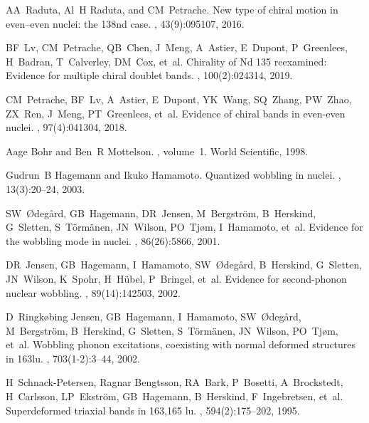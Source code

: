 \documentclass[11pt]{article}
\begin{document}
\begin{thebibliography}{99}
AA~Raduta, Al~H Raduta, and CM~Petrache.
\newblock New type of chiral motion in even--even nuclei: the 138nd case.
, 43(9):095107, 2016.

BF~Lv, CM~Petrache, QB~Chen, J~Meng, A~Astier, E~Dupont, P~Greenlees, H~Badran,
  T~Calverley, DM~Cox, et~al.
\newblock Chirality of Nd 135 reexamined: Evidence for multiple chiral doublet
  bands.
, 100(2):024314, 2019.

CM~Petrache, BF~Lv, A~Astier, E~Dupont, YK~Wang, SQ~Zhang, PW~Zhao, ZX~Ren,
  J~Meng, PT~Greenlees, et~al.
\newblock Evidence of chiral bands in even-even nuclei.
, 97(4):041304, 2018.

Aage Bohr and Ben~R Mottelson.
, volume~1.
\newblock World Scientific, 1998.

Gudrun~B Hagemann and Ikuko Hamamoto.
\newblock Quantized wobbling in nuclei.
, 13(3):20--24, 2003.

SW~{\O}deg{\aa}rd, GB~Hagemann, DR~Jensen, M~Bergstr{\"o}m, B~Herskind,
  G~Sletten, S~T{\"o}rm{\"a}nen, JN~Wilson, PO~Tj{\o}m, I~Hamamoto, et~al.
\newblock Evidence for the wobbling mode in nuclei.
, 86(26):5866, 2001.

DR~Jensen, GB~Hagemann, I~Hamamoto, SW~{\O}deg{\aa}rd, B~Herskind, G~Sletten,
  JN~Wilson, K~Spohr, H~H{\"u}bel, P~Bringel, et~al.
\newblock Evidence for second-phonon nuclear wobbling.
, 89(14):142503, 2002.

D~Ringk{\o}bing Jensen, GB~Hagemann, I~Hamamoto, SW~{\O}deg{\aa}rd,
  M~Bergstr{\"o}m, B~Herskind, G~Sletten, S~T{\"o}rm{\"a}nen, JN~Wilson,
  PO~Tj{\o}m, et~al.
\newblock Wobbling phonon excitations, coexisting with normal deformed
  structures in 163lu.
, 703(1-2):3--44, 2002.

H~Schnack-Petersen, Ragnar Bengtsson, RA~Bark, P~Bosetti, A~Brockstedt,
  H~Carlsson, LP~Ekstr{\"o}m, GB~Hagemann, B~Herskind, F~Ingebretsen, et~al.
\newblock Superdeformed triaxial bands in 163,165 lu.
, 594(2):175--202, 1995.


\end{thebibliography}
\end{document}

